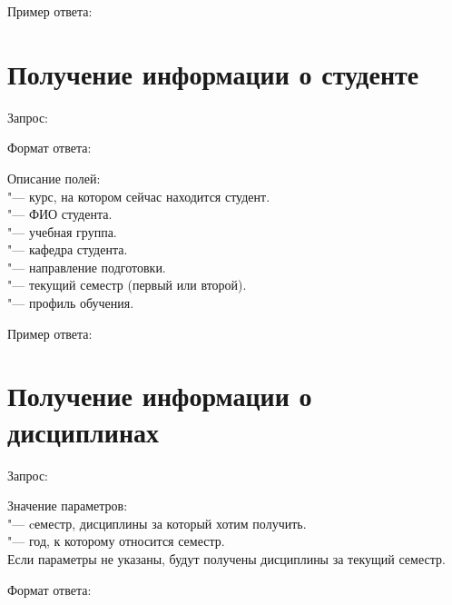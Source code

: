 Пример ответа:
\begin{listing}[H]
\end{listing}
\vspace{-0.75cm}

\section{Получение информации о студенте}
\label{sec:student}

Запрос: 

Формат ответа:
\begin{listing}[H]
\end{listing}
\vspace{-0.75cm}

Описание полей:\\
 "--- курс, на котором сейчас находится студент.\\
 "--- ФИО студента.\\
 "--- учебная группа.\\
 "--- кафедра студента.\\
 "--- направление подготовки.\\
 "--- текущий семестр (первый или второй).\\
 "--- профиль обучения.

Пример ответа:
\begin{listing}[H]
\end{listing}
\vspace{-0.75cm}

\section{Получение информации о дисциплинах}
\label{sec:dis}

Запрос: 

Значение параметров:\\
 "--- cеместр, дисциплины за который хотим получить.\\
 "--- год, к которому относится семестр.\\
Если параметры не указаны, будут получены дисциплины за текущий семестр.

Формат ответа:
\begin{listing}[H]
\end{listing}
\vspace{-0.75cm}


